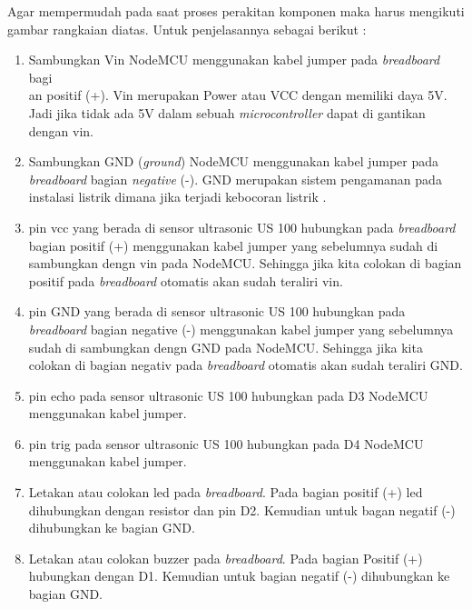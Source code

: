\par Agar mempermudah  pada saat proses perakitan komponen maka harus mengikuti gambar rangkaian diatas. Untuk penjelasannya sebagai berikut :
\begin{enumerate}
    \item Sambungkan Vin NodeMCU menggunakan kabel jumper pada \textit{breadboard} bagi\\an positif (+). Vin merupakan Power atau VCC dengan memiliki daya 5V. Jadi jika tidak ada 5V dalam sebuah \textit{microcontroller} dapat di gantikan dengan vin.
    \item Sambungkan GND (\textit{ground}) NodeMCU menggunakan kabel jumper pada \textit{breadboard} bagian \textit{negative} (-). GND merupakan sistem pengamanan pada instalasi listrik dimana jika terjadi kebocoran listrik .
    \item pin vcc yang berada di sensor ultrasonic US 100 hubungkan pada \textit{breadboard} bagian positif (+) menggunakan kabel jumper yang sebelumnya sudah di sambungkan dengn vin pada NodeMCU. Sehingga jika kita colokan di bagian positif pada \textit{breadboard} otomatis akan sudah teraliri vin.
    \item pin GND yang berada di sensor ultrasonic US 100 hubungkan pada \textit{breadboard} bagian negative (-) menggunakan kabel jumper yang sebelumnya sudah di sambungkan dengn GND pada NodeMCU. Sehingga jika kita colokan di bagian negativ pada \textit{breadboard} otomatis akan sudah teraliri GND.
    \item pin echo pada sensor ultrasonic US 100 hubungkan pada D3 NodeMCU menggunakan kabel jumper.
    \item pin trig pada sensor ultrasonic US 100 hubungkan pada D4 NodeMCU menggunakan kabel jumper.
    \item Letakan atau colokan led pada \textit{breadboard}. Pada bagian positif (+) led dihubungkan dengan resistor dan pin D2. Kemudian untuk bagan negatif (-) dihubungkan ke bagian GND.
    \item Letakan atau colokan buzzer pada \textit{breadboard}. Pada bagian Positif (+) hubungkan dengan D1. Kemudian untuk bagian negatif (-) dihubungkan ke bagian GND.
\end{enumerate}

